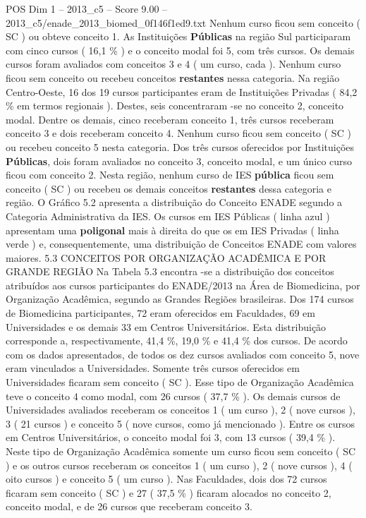 \begin{textsample}{POS Dim 1 – 2013\_c5 – Score 9.00 – 2013\_c5/enade\_2013\_biomed\_0f146f1ed9.txt}
Nenhum curso ficou sem conceito ( SC ) ou obteve conceito 1.
As Instituições \textbf{Públicas} na região Sul participaram com cinco cursos ( 16,1 \% ) e o conceito modal foi 5, com três cursos.
Os demais cursos foram avaliados com conceitos 3 e 4 ( um curso, cada ).
Nenhum curso ficou sem conceito ou recebeu conceitos \textbf{restantes} nessa categoria.
Na região Centro-Oeste, 16 dos 19 cursos participantes eram de Instituições Privadas ( 84,2 \% em termos regionais ).
Destes, seis concentraram -se no conceito 2, conceito modal.
Dentre os demais, cinco receberam conceito 1, três cursos receberam conceito 3 e dois receberam conceito 4.
Nenhum curso ficou sem conceito ( SC ) ou recebeu conceito 5 nesta categoria.
Dos três cursos oferecidos por Instituições \textbf{Públicas}, dois foram avaliados no conceito 3, conceito modal, e um único curso ficou com conceito 2.
Nesta região, nenhum curso de IES \textbf{pública} ficou sem conceito ( SC ) ou recebeu os demais conceitos \textbf{restantes} dessa categoria e região.
O Gráfico 5.2 apresenta a distribuição do Conceito ENADE segundo a Categoria Administrativa da IES.
Os cursos em IES Públicas ( linha azul ) apresentam uma \textbf{poligonal} mais à direita do que os em IES Privadas ( linha verde ) e, consequentemente, uma distribuição de Conceitos ENADE com valores maiores. 5.3 CONCEITOS POR ORGANIZAÇÃO ACADÊMICA E POR GRANDE REGIÃO Na Tabela 5.3 encontra -se a distribuição dos conceitos atribuídos aos cursos participantes do ENADE/2013 na Área de Biomedicina, por Organização Acadêmica, segundo as Grandes Regiões brasileiras.
Dos 174 cursos de Biomedicina participantes, 72 eram oferecidos em Faculdades, 69 em Universidades e os demais 33 em Centros Universitários.
Esta distribuição corresponde a, respectivamente, 41,4 \%, 19,0 \% e 41,4 \% dos cursos.
De acordo com os dados apresentados, de todos os dez cursos avaliados com conceito 5, nove eram vinculados a Universidades.
Somente três cursos oferecidos em Universidades ficaram sem conceito ( SC ).
Esse tipo de Organização Acadêmica teve o conceito 4 como modal, com 26 cursos ( 37,7 \% ).
Os demais cursos de Universidades avaliados receberam os conceitos 1 ( um curso ), 2 ( nove cursos ), 3 ( 21 cursos ) e conceito 5 ( nove cursos, como já mencionado ).
Entre os cursos em Centros Universitários, o conceito modal foi 3, com 13 cursos ( 39,4 \% ).
Neste tipo de Organização Acadêmica somente um curso ficou sem conceito ( SC ) e os outros cursos receberam os conceitos 1 ( um curso ), 2 ( nove cursos ), 4 ( oito cursos ) e conceito 5 ( um curso ).
Nas Faculdades, dois dos 72 cursos ficaram sem conceito ( SC ) e 27 ( 37,5 \% ) ficaram alocados no conceito 2, conceito modal, e de 26 cursos que receberam conceito 3.

\end{textsample}
